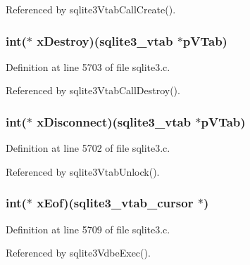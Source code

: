 Referenced by sqlite3\+Vtab\+Call\+Create().

\hypertarget{structsqlite3__module_af1b772670043b91e5e45a1a6becf9a41}{}
\subsubsection[{x\+Destroy}]{\setlength{\rightskip}{0pt plus 5cm}int($\ast$ x\+Destroy)({\bf sqlite3\+\_\+vtab} $\ast$p\+V\+Tab)}\label{structsqlite3__module_af1b772670043b91e5e45a1a6becf9a41}


Definition at line 5703 of file sqlite3.\+c.



Referenced by sqlite3\+Vtab\+Call\+Destroy().

\hypertarget{structsqlite3__module_a75840c001112dc870e9e9db39c0d4ed0}{}
\subsubsection[{x\+Disconnect}]{\setlength{\rightskip}{0pt plus 5cm}int($\ast$ x\+Disconnect)({\bf sqlite3\+\_\+vtab} $\ast$p\+V\+Tab)}\label{structsqlite3__module_a75840c001112dc870e9e9db39c0d4ed0}


Definition at line 5702 of file sqlite3.\+c.



Referenced by sqlite3\+Vtab\+Unlock().

\hypertarget{structsqlite3__module_a2cf433018879d601c54d0cf95f5e686c}{}
\subsubsection[{x\+Eof}]{\setlength{\rightskip}{0pt plus 5cm}int($\ast$ x\+Eof)({\bf sqlite3\+\_\+vtab\+\_\+cursor} $\ast$)}\label{structsqlite3__module_a2cf433018879d601c54d0cf95f5e686c}


Definition at line 5709 of file sqlite3.\+c.



Referenced by sqlite3\+Vdbe\+Exec().

\hypertarget{structsqlite3__module_a699a0a4ea742b78c6f2e8303619c72c2}{}
